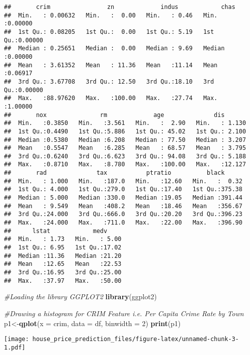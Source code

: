\documentclass[
]{article}
\newenvironment{Shaded}{\begin{snugshade}}{\end{snugshade}}
\newcommand{\CommentTok}[1]{\textcolor[rgb]{0.56,0.35,0.01}{\textit{#1}}}
\newcommand{\DataTypeTok}[1]{\textcolor[rgb]{0.13,0.29,0.53}{#1}}
\newcommand{\DecValTok}[1]{\textcolor[rgb]{0.00,0.00,0.81}{#1}}
\newcommand{\KeywordTok}[1]{\textcolor[rgb]{0.13,0.29,0.53}{\textbf{#1}}}
\newcommand{\NormalTok}[1]{#1}
\begin{document}
\begin{verbatim}
##       crim                zn             indus            chas        
##  Min.   : 0.00632   Min.   :  0.00   Min.   : 0.46   Min.   :0.00000  
##  1st Qu.: 0.08205   1st Qu.:  0.00   1st Qu.: 5.19   1st Qu.:0.00000  
##  Median : 0.25651   Median :  0.00   Median : 9.69   Median :0.00000  
##  Mean   : 3.61352   Mean   : 11.36   Mean   :11.14   Mean   :0.06917  
##  3rd Qu.: 3.67708   3rd Qu.: 12.50   3rd Qu.:18.10   3rd Qu.:0.00000  
##  Max.   :88.97620   Max.   :100.00   Max.   :27.74   Max.   :1.00000  
##       nox               rm             age              dis        
##  Min.   :0.3850   Min.   :3.561   Min.   :  2.90   Min.   : 1.130  
##  1st Qu.:0.4490   1st Qu.:5.886   1st Qu.: 45.02   1st Qu.: 2.100  
##  Median :0.5380   Median :6.208   Median : 77.50   Median : 3.207  
##  Mean   :0.5547   Mean   :6.285   Mean   : 68.57   Mean   : 3.795  
##  3rd Qu.:0.6240   3rd Qu.:6.623   3rd Qu.: 94.08   3rd Qu.: 5.188  
##  Max.   :0.8710   Max.   :8.780   Max.   :100.00   Max.   :12.127  
##       rad              tax           ptratio          black       
##  Min.   : 1.000   Min.   :187.0   Min.   :12.60   Min.   :  0.32  
##  1st Qu.: 4.000   1st Qu.:279.0   1st Qu.:17.40   1st Qu.:375.38  
##  Median : 5.000   Median :330.0   Median :19.05   Median :391.44  
##  Mean   : 9.549   Mean   :408.2   Mean   :18.46   Mean   :356.67  
##  3rd Qu.:24.000   3rd Qu.:666.0   3rd Qu.:20.20   3rd Qu.:396.23  
##  Max.   :24.000   Max.   :711.0   Max.   :22.00   Max.   :396.90  
##      lstat            medv      
##  Min.   : 1.73   Min.   : 5.00  
##  1st Qu.: 6.95   1st Qu.:17.02  
##  Median :11.36   Median :21.20  
##  Mean   :12.65   Mean   :22.53  
##  3rd Qu.:16.95   3rd Qu.:25.00  
##  Max.   :37.97   Max.   :50.00
\end{verbatim}

\begin{Shaded}
\begin{Highlighting}[]
\CommentTok{#Loading the library GGPLOT2}
\KeywordTok{library}\NormalTok{(ggplot2)}

\CommentTok{#Drawing a histogram for CRIM Feature i.e. Per Capita Crime Rate by Town}
\NormalTok{p1<-}\KeywordTok{qplot}\NormalTok{(}\DataTypeTok{x =}\NormalTok{ crim, }\DataTypeTok{data =}\NormalTok{ df, }\DataTypeTok{binwidth =} \DecValTok{2}\NormalTok{)}
\KeywordTok{print}\NormalTok{(p1)}
\end{Highlighting}
\end{Shaded}

\texttt{[image: house\_price\_prediction\_files/figure-latex/unnamed-chunk-3-1.pdf]}
\end{document}
